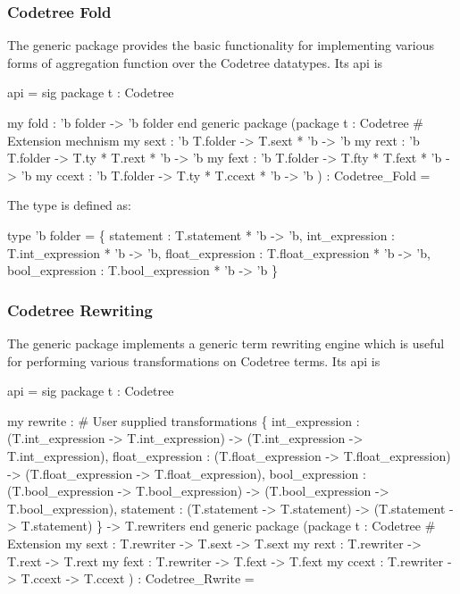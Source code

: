 \subsubsection{Codetree Fold}
The generic package 
provides the basic functionality for implementing various forms of
aggregation function over the Codetree datatypes.  Its api is
\begin{SML}
api  =
sig
   package t : Codetree

   my fold : 'b folder -> 'b folder
end
generic package 
  (package t : Codetree
   #  Extension mechnism 
   my sext  : 'b T.folder -> T.sext * 'b -> 'b
   my rext  : 'b T.folder -> T.ty * T.rext * 'b -> 'b
   my fext  : 'b T.folder -> T.fty * T.fext * 'b -> 'b
   my ccext : 'b T.folder -> T.ty * T.ccext * 'b -> 'b
  ) : Codetree_Fold =
\end{SML}
The type  is defined as:
\begin{SML}
   type 'b folder =
       \{ statement   : T.statement * 'b -> 'b,
         int_expression  : T.int_expression * 'b -> 'b,
         float_expression  : T.float_expression * 'b -> 'b, 
         bool_expression : T.bool_expression * 'b -> 'b
       \}
\end{SML}


\subsubsection{Codetree Rewriting}

The generic package 
implements a generic term rewriting engine which is useful for performing
various transformations on Codetree terms. Its api is
\begin{SML}
api  =
sig
   package t : Codetree

  my rewrite : 
       #  User supplied transformations 
       \{ int_expression  : (T.int_expression -> T.int_expression) -> (T.int_expression -> T.int_expression), 
         float_expression  : (T.float_expression -> T.float_expression) -> (T.float_expression -> T.float_expression),
         bool_expression : (T.bool_expression -> T.bool_expression) -> (T.bool_expression -> T.bool_expression),
         statement   : (T.statement -> T.statement) -> (T.statement -> T.statement)
       \} -> T.rewriters
end
generic package 
  (package t : Codetree
   #  Extension 
   my sext : T.rewriter -> T.sext -> T.sext
   my rext : T.rewriter -> T.rext -> T.rext
   my fext : T.rewriter -> T.fext -> T.fext
   my ccext : T.rewriter -> T.ccext -> T.ccext
  ) : Codetree_Rwrite =
\end{SML}

